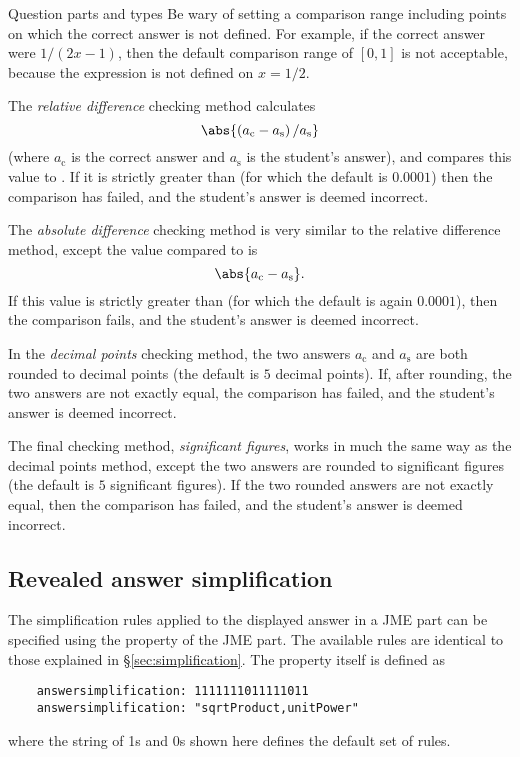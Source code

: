 \begin{chapter}{\label{cha:question_parts}Question parts and types}
  Be wary of setting a comparison range including points on which the correct
  answer is not defined.  For example, if the correct answer were $1/(2x-1)$,
  then the default comparison range of $[0,1]$ is not acceptable, because the
  expression is not defined on $x=1/2$.

  The \emph{relative difference} checking method calculates
  \begin{equation*}
    \abs{\left( a_{\mathrm{c}} - a_{\mathrm{s}} \right) / a_{\mathrm{s}}}
  \end{equation*}
  (where $a_{\mathrm{c}}$ is the correct answer and $a_{\mathrm{s}}$ is the
  student's answer), and compares this value to .
  If it is strictly greater than  (for which the
  default is $0.0001$) then the comparison has failed, and the student's answer
  is deemed incorrect.

  The \emph{absolute difference} checking method is very similar to the
  relative difference method, except the value compared to
   is
  \begin{equation*}
    \abs{a_{\mathrm{c}} - a_{\mathrm{s}}}.
  \end{equation*}
  If this value is strictly greater than  (for which
  the default is again $0.0001$), then the comparison fails, and the student's
  answer is deemed incorrect.

  In the \emph{decimal points} checking method, the two answers
  $a_{\mathrm{c}}$ and $a_{\mathrm{s}}$ are both rounded to
   decimal points (the default is $5$ decimal
  points).  If, after rounding, the two answers are not exactly equal, the
  comparison has failed, and the student's answer is deemed incorrect.

  The final checking method, \emph{significant figures}, works in much the same
  way as the decimal points method, except the two answers are rounded to
   significant figures (the default is $5$
  significant figures).  If the two rounded answers are not exactly equal, then
  the comparison has failed, and the student's answer is deemed incorrect.

  \subsection{\label{sec:answer_simplification}Revealed answer simplification}
  The simplification rules applied to the displayed answer in a JME part can be
  specified using the  property of the JME part.
  The available rules are identical to those explained in
  \S\ref{sec:simplification}.  The property itself is defined as
  \begin{Verbatim}
    answersimplification: 1111111011111011
    answersimplification: "sqrtProduct,unitPower"
  \end{Verbatim}
  where the string of 1s and 0s shown here defines the default set of rules.


\end{chapter}

